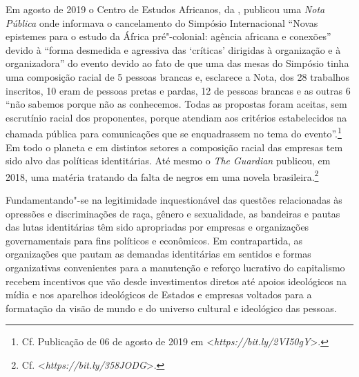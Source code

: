 Em agosto de 2019 o Centro de Estudos Africanos, da , publicou uma
\emph{Nota Pública} onde informava o cancelamento do Simpósio
Internacional ``Novas epistemes para o estudo da África pré"-colonial:
agência africana e conexões'' devido à ``forma desmedida e agressiva das
`críticas' dirigidas à organização e à organizadora'' do evento devido
ao fato de que uma das mesas do Simpósio tinha uma composição racial de
5 pessoas brancas e, esclarece a Nota, dos 28 trabalhos inscritos, 10
eram de pessoas pretas e pardas, 12 de pessoas brancas e as outras 6
``não sabemos porque não as conhecemos. Todas as propostas foram
aceitas, sem escrutínio racial dos proponentes, porque atendiam aos
critérios estabelecidos na chamada pública para comunicações que se
enquadrassem no tema do evento''.\footnote{Cf. Publicação de 06 de
  agosto de 2019 em
  \textless{}\emph{https://bit.ly/2VI50gY}\textgreater{}.}
Em todo o planeta e em distintos setores a composição racial das
empresas tem sido alvo das políticas identitárias. Até mesmo o \emph{The
Guardian} publicou, em 2018, uma matéria tratando da falta de negros em
uma novela brasileira.\footnote{Cf.
  \textless{}\emph{https://bit.ly/358JODG}\textgreater{}.}

Fundamentando"-se na legitimidade inquestionável das questões
relacionadas às opressões e discriminações de raça, gênero e
sexualidade, as bandeiras e pautas das lutas identitárias têm sido
apropriadas por empresas e organizações governamentais para fins
políticos e econômicos. Em contrapartida, as organizações que pautam as
demandas identitárias em sentidos e formas organizativas convenientes
para a manutenção e reforço lucrativo do capitalismo recebem incentivos
que vão desde investimentos diretos até apoios ideológicos na mídia e
nos aparelhos ideológicos de Estados e empresas voltados para a
formatação da visão de mundo e do universo cultural e ideológico das
pessoas.

